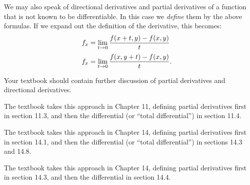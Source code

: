 \documentclass[12pt]{amsart}
\begin{document}
We may also speak of directional derivatives and partial derivatives of a function that is not known to be differentiable.
In this case we \emph{define} them by the above formulas.
If we expand out the definition of the derivative, this becomes:
\begin{align}
  {f}_{x} &= \lim_{t\to 0} \frac{f(x+t,y) - f(x,y)}{t}\\[2pt]
  {f}_{x} &= \lim_{t\to 0} \frac{f(x,y+t) - f(x,y)}{t}.
\end{align}
\begin{notextbook}Your textbook should contain further discussion of partial derivatives and directional derivatives.\end{notextbook}%
\begin{stewart}The textbook takes this approach in Chapter 11, defining partial derivatives first in section 11.3, and then the differential (or ``total differential'') in section 11.4.\end{stewart}%
\begin{hugheshallett}The textbook takes this approach in Chapter 14, defining partial derivatives first in section 14.1, and then the differential (or ``total differential'') in sections 14.3 and 14.8.\end{hugheshallett}%
\begin{rogawski}The textbook takes this approach in Chapter 14, defining partial derivatives first in section 14.3, and then the differential in section 14.4.\end{rogawski}%
\end{document}
